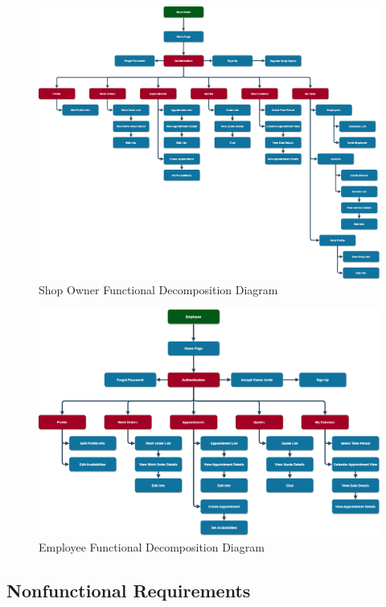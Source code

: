 \documentclass[12pt]{article}
\begin{document}
\begin{figure}[H]
    \centering
    \includegraphics[scale=0.26]{SRS/owner_decomp.png}
    \caption{Shop Owner Functional Decomposition Diagram}
    \label{fig:ofdd}
\end{figure}

\begin{figure}[H]
    \centering
    \includegraphics[scale=0.3]{SRS/employee_decomp.png}
    \caption{Employee Functional Decomposition Diagram}
    \label{fig:efdd}
\end{figure}

\subsection{Nonfunctional Requirements}
\end{document}
